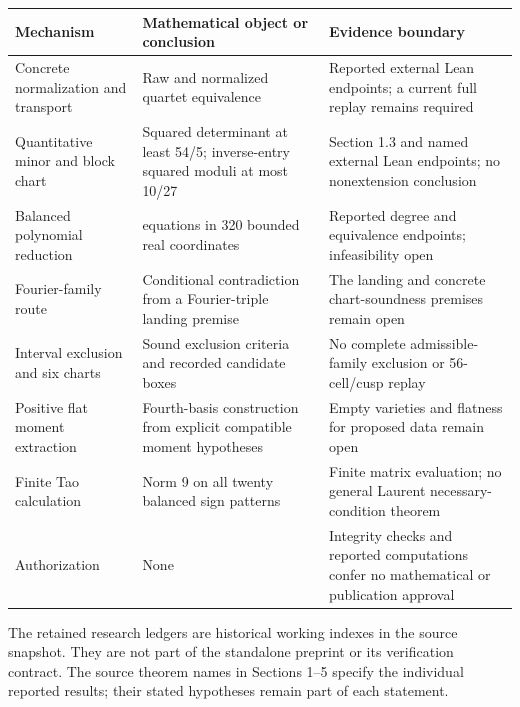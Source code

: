 \documentclass[
]{article}
\begin{document}
\begin{longtable}[]{@{}
  >{\raggedright\arraybackslash}p{}
  >{\raggedright\arraybackslash}p{}
  >{\raggedright\arraybackslash}p{}@{}}
\toprule\noalign{}
\begin{minipage}[b]{\linewidth}\raggedright
Mechanism
\end{minipage} & \begin{minipage}[b]{\linewidth}\raggedright
Mathematical object or conclusion
\end{minipage} & \begin{minipage}[b]{\linewidth}\raggedright
Evidence boundary
\end{minipage} \\
\midrule\noalign{}
\endhead
\bottomrule\noalign{}
\endlastfoot
Concrete normalization and transport & Raw and normalized quartet
equivalence & Reported external Lean endpoints; a current full replay
remains required \\
Quantitative minor and block chart & Squared determinant at least 54/5;
inverse-entry squared moduli at most 10/27 & Section 1.3 and named
external Lean endpoints; no nonextension conclusion \\
Balanced polynomial reduction & 648 equations in 320 bounded real
coordinates & Reported degree and equivalence endpoints; infeasibility
open \\
Fourier-family route & Conditional contradiction from a Fourier-triple
landing premise & The landing and concrete chart-soundness premises
remain open \\
Interval exclusion and six charts & Sound exclusion criteria and
recorded candidate boxes & No complete admissible-family exclusion or
56-cell/cusp replay \\
Positive flat moment extraction & Fourth-basis construction from
explicit compatible moment hypotheses & Empty varieties and flatness for
proposed data remain open \\
Finite Tao calculation & Norm 9 on all twenty balanced sign patterns &
Finite matrix evaluation; no general Laurent necessary-condition
theorem \\
Authorization & None & Integrity checks and reported computations confer
no mathematical or publication approval \\
\end{longtable}

The retained research ledgers are historical working indexes in the
source snapshot. They are not part of the standalone preprint or its
verification contract. The source theorem names in Sections 1--5 specify
the individual reported results; their stated hypotheses remain part of
each statement.
\end{document}
